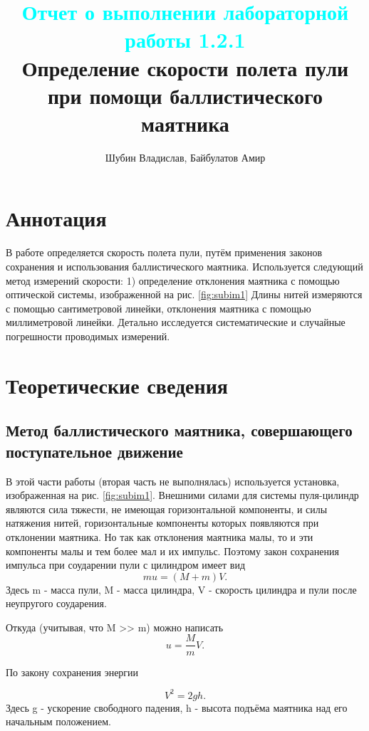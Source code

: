 \documentclass[
	a4paper, %
	12pt, %
]{article}
\title{
	\textcolor{cyan}{Отчет о выполнении лабораторной работы 1.2.1}
	\\
	Определение скорости полета пули при помощи баллистического маятника
}
\author{Шубин Владислав, Байбулатов Амир}
\begin{document}
    
	
	\maketitle
	
	\section{Аннотация}
	В работе определяется скорость полета пули, путём применения законов сохранения и использования баллистического маятника. Используется следующий метод измерений скорости: 1) определение отклонения маятника с помощью оптической системы, изображенной на рис. \ref{fig:subim1} Длины нитей измеряются с помощью сантиметровой линейки, отклонения маятника с помощью миллиметровой линейки. Детально исследуется систематические и случайные погрешности проводимых измерений.
	
	
	\section{Теоретические сведения}
	
	\subsection{Метод баллистического маятника, совершающего поступательное движение}
	
	В этой части работы (вторая часть не выполнялась) используется установка, изображенная на рис. \ref{fig:subim1}. Внешними силами для системы пуля-цилиндр являются сила тяжести, не имеющая горизонтальной компоненты, и силы натяжения нитей, горизонтальные компоненты которых появляются при отклонении маятника. Но так как отклонения маятника малы, то и эти компоненты малы и тем более мал и их импульс. Поэтому закон сохранения импульса при соударении пули с цилиндром имеет вид
	\begin{equation}
		mu = (M + m)V.
	\end{equation}
	Здесь m - масса пули, M - масса цилиндра, V - скорость цилиндра и пули после неупругого соударения.
	
	Откуда (учитывая, что M >> m) можно написать
	\begin{equation}
		u = \frac{M}{m}V.
	\end{equation}
	
	По закону сохранения энергии
	
	\begin{equation}
		V^2 = 2gh.
	\end{equation}
	Здесь g - ускорение свободного падения, h - высота подъёма маятника над его начальным положением.
	
\end{document}
